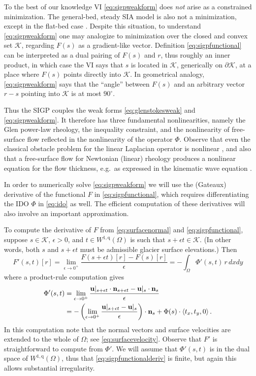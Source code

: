 \documentclass[letterpaper,final,12pt,reqno]{amsart}
\theoremstyle{claim}
\newcommand{\eps}{\epsilon}
\newcommand{\bn}{\mathbf{n}}
\newcommand{\bu}{\mathbf{u}}
\newcommand{\qq}{{\text{q}}}
\numberwithin{equation}{section}
\numberwithin{figure}{section}
\numberwithin{table}{section}
\numberwithin{theorem}{section}
\begin{document}
To the best of our knowledge VI \eqref{eq:sigpweakform} does \emph{not} arise as a constrained minimization.  The general-bed, steady SIA model is also not a minimization, except in the flat-bed case \cite{JouvetBueler2012}.  Despite this situation, to understand \eqref{eq:sigpweakform} one may analogize to minimization over the closed and convex set $\mathcal{K}$, regarding $F(s)$ as a gradient-like vector.  Definition \eqref{eq:sigpfunctional} can be interpreted as a dual pairing of $F(s)$ and $r$, thus roughly an inner product, in which case the VI says that $s$ is located in $\mathcal{K}$, generically on $\partial\mathcal{K}$, at a place where $F(s)$ points directly into $\mathcal{K}$.  In geometrical analogy, \eqref{eq:sigpweakform} says that the ``angle'' between $F(s)$ and an arbitrary vector $r-s$ pointing into $\mathcal{K}$ is at most $90^\circ$.

Thus the SIGP couples the weak forms \eqref{eq:glenstokesweak} and \eqref{eq:sigpweakform}.  It therefore has three fundamental nonlinearities, namely the Glen power-law rheology, the inequality constraint, and the nonlinearity of free-surface flow reflected in the nonlinearity of the operator $\Phi$.  Observe that even the classical obstacle problem for the linear Laplacian operator is nonlinear \cite{KinderlehrerStampacchia1980}, and also that a free-surface flow for Newtonian (linear) rheology produces a nonlinear equation for the flow thickness, e.g.~as expressed in the kinematic wave equation \cite{Ockendonetal2003}.

In order to numerically solve \eqref{eq:sigpweakform} we will use the (Gateaux) derivative of the functional $F$ in \eqref{eq:sigpfunctional}, which requires differentiating the IDO $\Phi$ in \eqref{eq:ido} as well.  The efficient computation of these derivatives will also involve an important approximation.

To compute the derivative of $F$ from \eqref{eq:surfacenormal} and \eqref{eq:sigpfunctional}, suppose $s\in \mathcal{K}$, $\eps>0$, and $t \in W^{1,\qq}(\Omega)$ is such that $s+\eps t \in \mathcal{K}$.  (In other words, both $s$ and $s+\eps t$ must be admissible glacier surface elevations.)  Then
\begin{equation}
F'(s,t)[r] = \lim_{\eps\to 0^+} \frac{F(s+\eps t)[r] - F(s)[r]}{\eps} = - \int_\Omega \Phi'(s,t)\, r \,dx dy \label{eq:sigpfunctionalderiv}
\end{equation}
where a product-rule computation gives
\begin{align}
\Phi'(s,t) &= \lim_{\eps\to 0^+} \frac{\bu|_{s+\eps t} \cdot \bn_{s+\eps t} - \bus \cdot \bn_s}{\eps} \label{eq:idoderiv} \\
    &= - \left(\lim_{\eps\to 0^+} \frac{\bu|_{s+\eps t} - \bus}{\eps}\right) \cdot \bn_s + \Phi(s) \cdot \left<t_x,t_y,0\right>. \notag
\end{align}
In this computation note that the normal vectors and surface velocities are extended to the whole of $\Omega$; see \eqref{eq:surfacevelocity}.  Observe that $F'$ is straightforward to compute from $\Phi'$.  We will assume that $\Phi'(s,t)$ is in the dual space of $W^{1,\qq}(\Omega)$, thus that \eqref{eq:sigpfunctionalderiv} is finite, but again this allows substantial irregularity.
\end{document}
